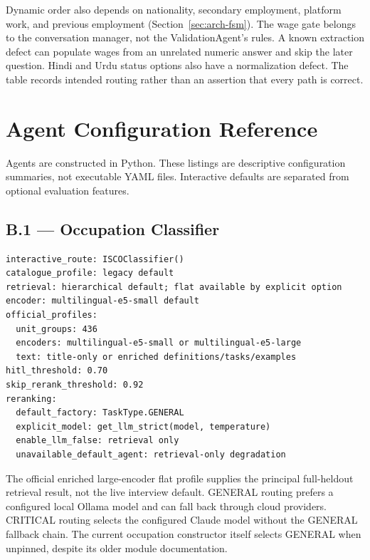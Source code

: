 Dynamic order also depends on nationality, secondary employment, platform
work, and previous employment (Section~\ref{sec:arch-fsm}). The wage gate
belongs to the conversation manager, not the ValidationAgent's rules.
A known extraction defect can populate wages from an unrelated numeric
answer and skip the later question. Hindi and Urdu status options also
have a normalization defect. The table records intended routing rather
than an assertion that every path is correct.

\chapter{Agent Configuration Reference}
\label{app:crewai}

Agents are constructed in Python. These listings are descriptive
configuration summaries, not executable YAML files. Interactive defaults
are separated from optional evaluation features.

\section*{B.1 --- Occupation Classifier}
\begin{lstlisting}[caption={Current occupation-classifier configuration summary.}]
interactive_route: ISCOClassifier()
catalogue_profile: legacy default
retrieval: hierarchical default; flat available by explicit option
encoder: multilingual-e5-small default
official_profiles:
  unit_groups: 436
  encoders: multilingual-e5-small or multilingual-e5-large
  text: title-only or enriched definitions/tasks/examples
hitl_threshold: 0.70
skip_rerank_threshold: 0.92
reranking:
  default_factory: TaskType.GENERAL
  explicit_model: get_llm_strict(model, temperature)
  enable_llm_false: retrieval only
  unavailable_default_agent: retrieval-only degradation
\end{lstlisting}

The official enriched large-encoder flat profile supplies the principal
full-heldout retrieval result, not the live interview default. GENERAL routing
prefers a configured local Ollama model and can fall back through cloud
providers. CRITICAL routing selects the configured Claude model without
the GENERAL fallback chain. The current occupation constructor itself
selects GENERAL when unpinned, despite its older module documentation.

